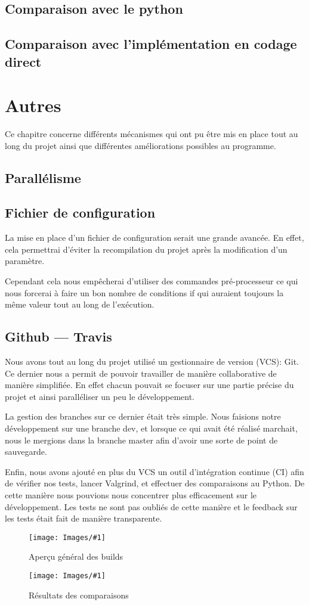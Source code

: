 \documentclass[hideweeklyreports]{polytech/polytech}
\newcommand{\img}[3]{%
	\begin{figure}[H]
		\centering
   		\texttt{[image: Images/\#1]}
  	 	\caption{#2}
	\end{figure}
}
\begin{document}
		\section{Comparaison avec le python} %
		\section{Comparaison avec l'implémentation en codage direct} %
	
	\chapter{Autres}
		Ce chapitre concerne différents mécanismes qui ont pu être mis en place tout au long du projet ainsi que différentes améliorations possibles au programme.
		
		\section{Parallélisme} %
		
		\section{Fichier de configuration}
			La mise en place d'un fichier de configuration serait une grande avancée. En effet, cela permettrai d'éviter la recompilation du projet après la modification d'un paramètre.
			
			Cependant cela nous empêcherai d'utiliser des commandes pré-processeur ce qui nous forcerai à faire un bon nombre de conditions if qui auraient toujours la même valeur tout au long de l'exécution.
		
		\section{Github — Travis}
			Nous avons tout au long du projet utilisé un gestionnaire de version (VCS): Git. Ce dernier nous a permit de pouvoir travailler de manière collaborative de manière simplifiée. En effet chacun pouvait se focuser sur une partie précise du projet et ainsi paralléliser un peu le développement.
			
			La gestion des branches sur ce dernier était très simple. Nous faisions notre développement sur une branche dev, et lorsque ce qui avait été réalisé marchait, nous le mergions dans la branche master afin d'avoir une sorte de point de sauvegarde.
			
			Enfin, nous avons ajouté en plus du VCS un outil d'intégration continue (CI) afin de vérifier nos tests, lancer Valgrind, et effectuer des comparaisons au Python. De cette manière nous pouvions nous concentrer plus efficacement sur le développement. Les tests ne sont pas oubliés de cette manière et le feedback sur les tests était fait de manière transparente.
			\img{TravisAll.png}{Aperçu général des builds}{0.5}
			\img{TravisCompare.png}{Résultats des comparaisons}{0.575}
			
\end{document}
